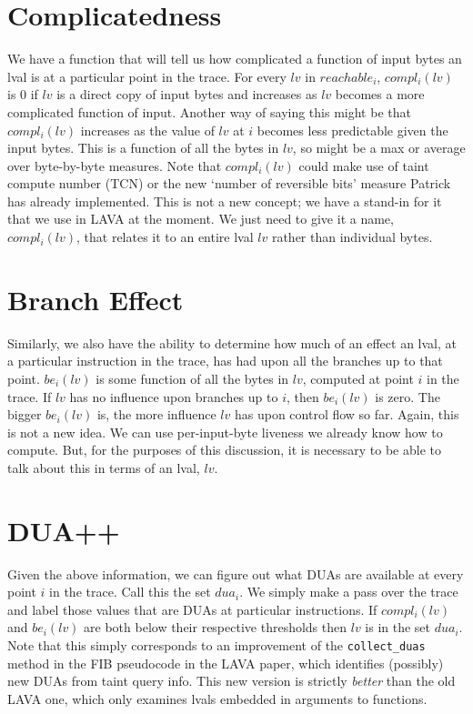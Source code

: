 \documentclass{article}
\begin{document}
\section{Complicatedness}

We have a function that will tell us how complicated a function of input bytes an lval is at a particular point in the trace.  For every $lv$ in $reachable_i$,  $compl_i(lv)$ is 0 if $lv$ is a direct copy of input bytes and increases as $lv$ becomes a more complicated function of input.  Another way of saying this might be that $compl_i(lv)$ increases as the value of $lv$ at $i$ becomes less predictable given the input bytes.
This is a function of all the bytes in $lv$, so might be a max or average over byte-by-byte measures.
Note that $compl_i(lv)$ could make use of taint compute number (TCN) or the new `number of reversible bits' measure Patrick has already implemented.  
This is not a new concept; we have a stand-in for it that we use in LAVA at the moment.  
We just need to give it a name, $compl_i(lv)$, that relates it to an entire lval $lv$ rather than individual bytes.

\section{Branch Effect}

Similarly, we also have the ability to determine how much of an effect an lval, at a particular instruction in the trace, has had upon all the branches up to that point.  $be_i(lv)$ is some function of all the bytes in $lv$, computed at point $i$ in the trace.  If $lv$ has no influence upon branches up to $i$, then $be_i(lv)$ is zero.  The bigger $be_i(lv)$ is, the more influence $lv$ has upon control flow so far.  
Again, this is not a new idea.  We can use per-input-byte liveness we already know how to compute.  
But, for the purposes of this discussion, it is necessary to be able to talk about this in terms of an lval, $lv$.

\section{DUA++}

Given the above information, we can figure out what DUAs are available at every point $i$ in the trace.  Call this the set $dua_i$.  We simply make a pass over the trace and label those values that are DUAs at particular instructions. If $compl_i(lv)$ and $be_i(lv)$ are both below their respective thresholds then $lv$ is in the set $dua_i$. Note that this simply corresponds to an improvement of the \verb+collect_duas+ method in the FIB pseudocode in the LAVA paper, which identifies (possibly) new DUAs from taint query info.  
This new version is strictly \emph{better} than the old LAVA one, which only examines lvals embedded in arguments to functions.  
\end{document}
